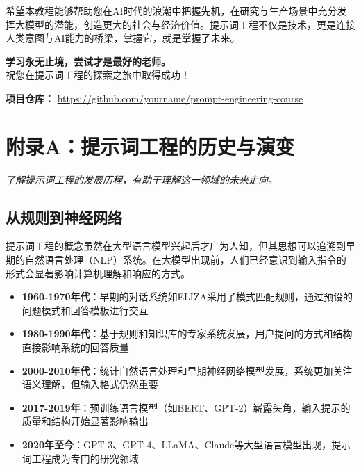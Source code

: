 \documentclass[12pt]{ctexart}
\newcommand{\chapternote}[1]{\vspace{-0.3cm}\par\noindent\textit{\small #1}\vspace{0.3cm}}
\begin{document}
希望本教程能够帮助您在AI时代的浪潮中把握先机，在研究与生产场景中充分发挥大模型的潜能，创造更大的社会与经济价值。提示词工程不仅是技术，更是连接人类意图与AI能力的桥梁，掌握它，就是掌握了未来。

\begin{center}
\textbf{学习永无止境，尝试才是最好的老师。}\\
祝您在提示词工程的探索之旅中取得成功！
\end{center}

\vspace{1cm}
\noindent\textbf{项目仓库：} \url{https://github.com/yourname/prompt-engineering-course}

\vspace{0.5cm}
\begin{center}
\end{center}

\section{附录A：提示词工程的历史与演变}
\chapternote{了解提示词工程的发展历程，有助于理解这一领域的未来走向。}

\subsection{从规则到神经网络}
提示词工程的概念虽然在大型语言模型兴起后才广为人知，但其思想可以追溯到早期的自然语言处理（NLP）系统。在大模型出现前，人们已经意识到输入指令的形式会显著影响计算机理解和响应的方式。

\begin{itemize}
  \item \textbf{1960-1970年代}：早期的对话系统如ELIZA采用了模式匹配规则，通过预设的问题模式和回答模板进行交互
  \item \textbf{1980-1990年代}：基于规则和知识库的专家系统发展，用户提问的方式和结构直接影响系统的回答质量
  \item \textbf{2000-2010年代}：统计自然语言处理和早期神经网络模型发展，系统更加关注语义理解，但输入格式仍然重要
  \item \textbf{2017-2019年}：预训练语言模型（如BERT、GPT-2）崭露头角，输入提示的质量和结构开始显著影响输出
  \item \textbf{2020年至今}：GPT-3、GPT-4、LLaMA、Claude等大型语言模型出现，提示词工程成为专门的研究领域
\end{itemize}
\end{document}

